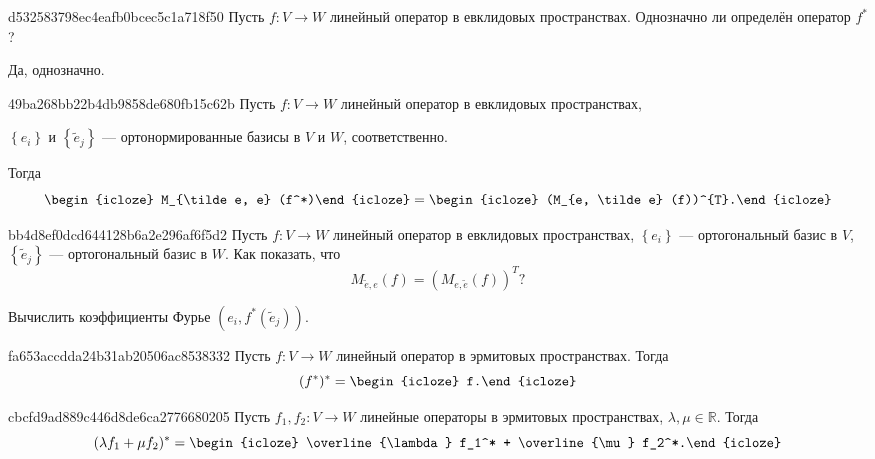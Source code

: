 \begin{note}{d532583798ec4eafb0bcec5c1a718f50}
    Пусть \({ f: V \to W }\) линейный оператор в евклидовых пространствах.
    Однозначно ли определён оператор \({ f^* }\)?

    \begin{cloze}{1}
        Да, однозначно.
    \end{cloze}
\end{note}

\begin{note}{49ba268bb22b4db9858de680fb15c62b}
    Пусть \({ f: V \to W }\) линейный оператор в евклидовых пространствах, \begin{icloze}{3}\({ \left\{ e_i \right\} }\) и \({ \left\{ \tilde e_j \right\} }\) --- ортонормированные базисы в \({ V }\) и \({ W }\), соответственно.\end{icloze}
    Тогда
    \[
        \begin{icloze}{2}M_{\tilde e, e} (f^*)\end{icloze} = \begin{icloze}{1}(M_{e, \tilde e} (f))^{T}.\end{icloze}
    \]
\end{note}

\begin{note}{bb4d8ef0dcd644128b6a2e296af6f5d2}
    Пусть \({ f: V \to W }\) линейный оператор в евклидовых пространствах, \({ \left\{ e_i \right\} }\) --- ортогональный базис в \({ V }\), \({ \left\{ \tilde e_j \right\} }\) --- ортогональный базис в \({ W }\).
    Как показать, что
    \[
        M_{\tilde e, e} (f) = (M_{e, \tilde e} (f))^{T}?
    \]

    \begin{cloze}{1}
        Вычислить коэффициенты Фурье \({ (e_i, f^*(\tilde e_j)) }\).
    \end{cloze}
\end{note}

\begin{note}{fa653accdda24b31ab20506ac8538332}
    Пусть \({ f: V \to W }\) линейный оператор в эрмитовых пространствах.
    Тогда
    \[
        (f^*)^* = \begin{icloze}{1}f.\end{icloze}
    \]
\end{note}

\begin{note}{cbcfd9ad889c446d8de6ca2776680205}
    Пусть \({ f_1, f_2 : V \to W }\) линейные операторы в эрмитовых пространствах,\: \({ \lambda, \mu  \in \mathbb R }\).
    Тогда
    \[
        (\lambda f_1 + \mu f_2)^* = \begin{icloze}{1}\overline{\lambda} f_1^* + \overline{\mu} f_2^*.\end{icloze}
    \]
\end{note}

